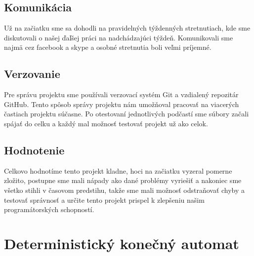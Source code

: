 \documentclass [11pt, a4paper]{article}
\begin{document}
\subsection{Komunikácia}
Už na začiatku sme sa dohodli na pravidelných týždenných stretnutiach, kde sme diskutovali o našej ďaľšej práci na nadchádzajúci týždeň. Komunikovali sme najmä cez facebook a skype a osobné stretnutia boli veľmi príjemné. 

\subsection{Verzovanie}
Pre správu projektu sme používali verzovací systém Git a vzdialený repozitár GitHub. Tento spôsob správy projektu nám umožňoval pracovať na viacerých častiach projektu súčasne. Po otestovaní jednotlivých podčastí sme súbory začali spájať do celku a každý mal možnosť testovať projekt už ako celok.

\subsection{Hodnotenie}
Celkovo hodnotíme tento projekt kladne, hoci na začiatku vyzeral pomerne zložito, postupne sme mali nápady ako dané problémy vyriešiť a nakoniec sme všetko stihli v časovom predstihu, takže sme mali možnosť odstraňovať chyby a testovať správnosť a určite tento projekt prispel k zlepšeniu našim programátorských schopností.
\newpage

\renewcommand{\refname}{Použitá literatúra}


\newpage
\appendix

\section{Deterministický konečný automat}
\end{document}
